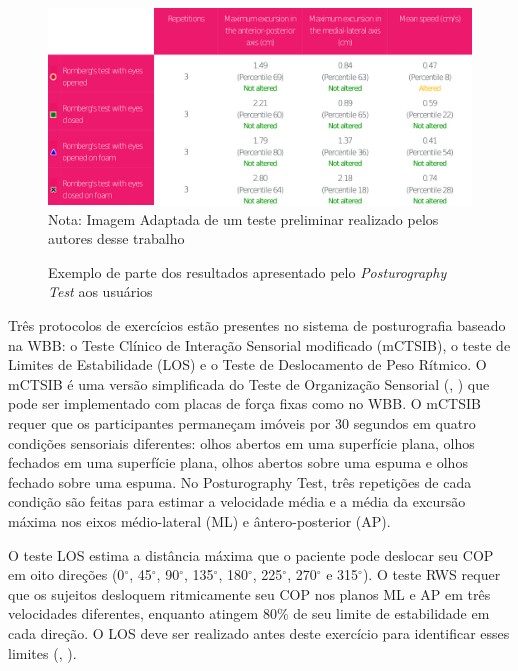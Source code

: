 \begin{figure}
\captionsetup{justification   = raggedright,
              singlelinecheck = false}
\caption{Exemplo de parte dos resultados apresentado pelo \textit{Posturography Test} aos usuários}\label{pTeste}
\includegraphics[width=1.0\textwidth]{figs/PTeste.png}
\\\footnotesize Nota: Imagem Adaptada de um teste preliminar realizado pelos autores desse trabalho
\end{figure}



Três protocolos de exercícios estão presentes no sistema de posturografia baseado na WBB: o Teste Clínico de Interação Sensorial modificado (mCTSIB), o teste de Limites de Estabilidade (LOS) e o Teste de Deslocamento de Peso Rítmico. O mCTSIB é uma versão simplificada do Teste de Organização Sensorial (\citeauthor{ford1995test}, \citeyear{ford1995test}) que pode ser implementado com placas de força fixas como no WBB. O mCTSIB requer que os participantes permaneçam imóveis por 30 segundos em quatro condições sensoriais diferentes: olhos abertos em uma superfície plana, olhos fechados em uma superfície plana, olhos abertos sobre uma espuma e olhos fechado sobre uma espuma. No Posturography Test, três repetições de cada condição são feitas para estimar a velocidade média e a média da excursão máxima nos eixos médio-lateral (ML) e ântero-posterior (AP).

O teste LOS estima a distância máxima que o paciente pode deslocar seu COP em oito direções (0$^{\circ}$, 45$^{\circ}$, 90$^{\circ}$, 135$^{\circ}$, 180$^{\circ}$, 225$^{\circ}$, 270$^{\circ}$ e 315$^{\circ}$). O teste RWS requer que os sujeitos desloquem ritmicamente seu COP nos planos ML e AP em três velocidades diferentes, enquanto atingem 80\% de seu limite de estabilidade em cada direção. O LOS deve ser realizado antes deste exercício para identificar esses limites (\citeauthor{llorens2015low}, \citeyear{llorens2015low}).

